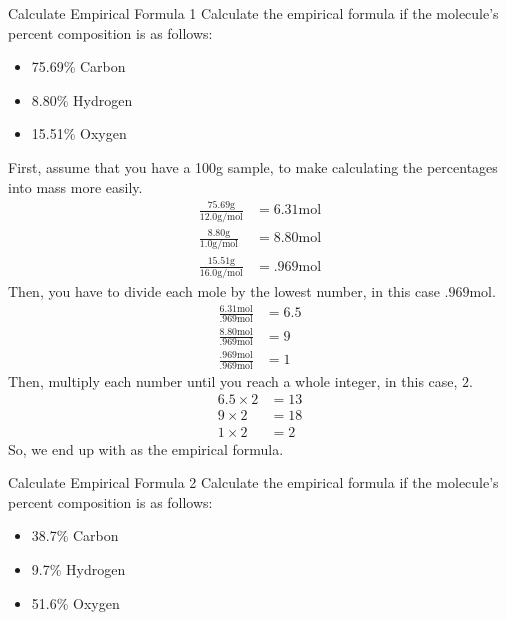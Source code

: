 \begin{example}[]{Calculate Empirical Formula 1}
  Calculate the empirical formula if the molecule's percent composition is as follows:
  \begin{itemize}[noitemsep, nolistsep]
    \item 75.69\% Carbon
    \item 8.80\% Hydrogen
    \item 15.51\% Oxygen
  \end{itemize}

  \tcblower

  First, assume that you have a 100\si{\gram} sample, to make calculating the percentages into mass more easily.
  \begin{align*}
    \frac{75.69 \si{\gram}}{12.0 \si{\gram / \mole}} &= 6.31 \si{\mole} \\
    \frac{8.80 \si{\gram}}{1.0 \si{\gram / \mole}} &= 8.80 \si{\mole} \\
    \frac{15.51 \si{\gram}}{16.0 \si{\gram / \mole}} &= .969 \si{\mole}
  \end{align*}
  Then, you have to divide each mole by the lowest number, in this case $.969 \si{\mole}$.
  \begin{align*}
    \frac{6.31 \si{\mole}}{.969 \si{\mole}} &= 6.5 \\
    \frac{8.80 \si{\mole}}{.969 \si{\mole}} &= 9 \\
    \frac{.969 \si{\mole}}{.969 \si{\mole}} &= 1
  \end{align*}
  Then, multiply each number until you reach a whole integer, in this case, $2$.
  \begin{align*}
    6.5 \times 2 &= 13 \\
    9 \times 2 &= 18 \\
    1 \times 2 &= 2
  \end{align*}
  So, we end up with  as the empirical formula.
\end{example}

\begin{example}[]{Calculate Empirical Formula 2}
  Calculate the empirical formula if the molecule's percent composition is as follows:
  \begin{itemize}[noitemsep, nolistsep]
    \item 38.7\% Carbon
    \item 9.7\% Hydrogen
    \item 51.6\% Oxygen
  \end{itemize}

  \tcblower

\end{example}

